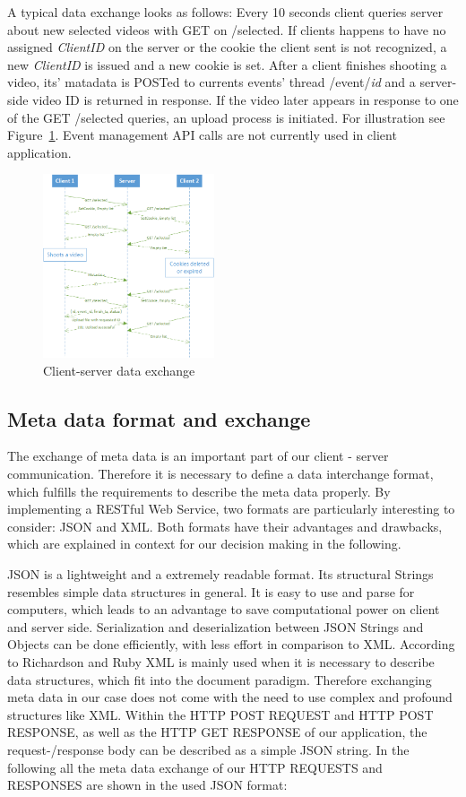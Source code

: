 \documentclass[conference]{IEEEtran}
\begin{document}
A typical data exchange looks as follows:
Every 10 seconds client queries server about new selected videos with GET on /selected.
If clients happens to have no assigned \textsl{ClientID} on the server or the cookie the client 
sent is not recognized, a new \textsl{ClientID} is issued and a new cookie is set.
After a client finishes shooting a video, its' matadata is POSTed to currents events' thread /event/\textit{id}
and a server-side video ID is returned in response.
If the video later appears in response to one of the GET /selected queries, an upload process is initiated.
For illustration see Figure~\ref{fig:protocol}.
Event management API calls are not currently used in client application.

\begin{figure}[!t]
	\centering
	\includegraphics[width=0.45\textwidth]{protocol.png}
	\caption{Client-server data exchange}
	\label{fig:protocol}
\end{figure}

\subsection{Meta data format and exchange}
The exchange of meta data is an important part of our client - server communication.
Therefore it is necessary to define a data interchange format, which fulfills the requirements to describe the meta data properly.
By implementing a RESTful Web Service, two formats are particularly interesting to consider: JSON and XML.
Both formats have their advantages and drawbacks, which are explained in context for our decision making in the following.

JSON is a lightweight and a extremely readable format. Its structural Strings resembles simple data structures in general. 
It is easy to use and parse for computers, which leads to an advantage to save computational power on client and server side. 
Serialization and deserialization between JSON Strings and Objects can be done efficiently, with less effort in comparison to XML.
According to Richardson and Ruby XML is mainly used when it is necessary to describe data structures, which fit into the document paradigm. 
Therefore exchanging meta data in our case does not come with the need to use complex and profound structures like XML. 
Within the HTTP POST REQUEST and HTTP POST RESPONSE, as well as the HTTP GET RESPONSE  of our application, 
the request-/response body can be described as a simple JSON string. In the following all the meta data exchange of our HTTP REQUESTS and 
RESPONSES are shown in the used JSON format:
\end{document}
